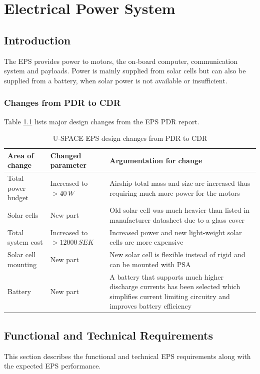 \chapter{Electrical Power System}
\label{chap:eps}

\section{Introduction}
\label{sec:introduction}

The \ac{EPS} provides power to motors, the on-board computer, communication system and payloads. Power is mainly supplied from solar cells but can also be supplied from a battery, when solar power is not available or insufficient. 

\subsection{Changes from PDR to CDR}
\label{sec:changes_pdr_to_cdr}
%
Table \ref{tab:pdr_to_cdr} lists major design changes from the \ac{EPS} \ac{PDR} report.

\begin{table}[H]
\centering
\caption{U-SPACE \ac{EPS} design changes from PDR to CDR}
\label{tab:pdr_to_cdr}
\begin{tabular}{p{}p{}p{}}
\hline
\textbf{Area of change} & \textbf{Changed parameter } & \textbf{Argumentation for change}\\
\hline
Total power budget & Increased to $>40\,W$ & Airship total mass and size are increased thus requiring much more power for the motors\\
Solar cells & New part & Old solar cell was much heavier than listed in manufacturer datasheet due to a glass cover\\
Total system cost & Increased to $>12000\,SEK$ & Increased power and new light-weight solar cells are more expensive\\
Solar cell mounting & New part & New solar cell is flexible instead of rigid and can be mounted with \ac{PSA}\\
Battery & New part & A battery that supports much higher discharge currents has been selected which simplifies current limiting circuitry and improves battery efficiency\\
\hline
\end{tabular}
\end{table} 
%
%
\section{Functional and Technical Requirements}
\label{sec:requirements}
This section describes the functional and technical \ac{EPS} requirements along with the expected \ac{EPS} performance.
%
